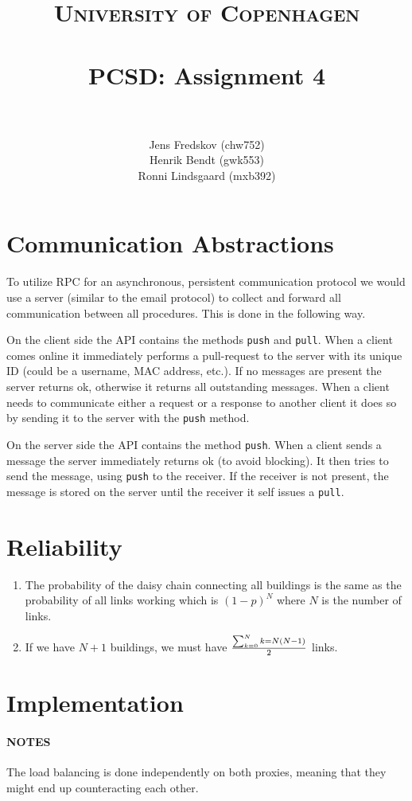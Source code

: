 \documentclass[a4paper, 11pt]{article}
\title{ 
\normalfont \normalsize 
\textsc{University of Copenhagen} \\ [25pt]
\horrule{0.5pt} \\[0.4cm]
\huge PCSD: Assignment 4 \\
\horrule{2pt} \\[0.5cm]
}
\author{Jens Fredskov (chw752)\\Henrik Bendt (gwk553)\\Ronni Lindsgaard (mxb392)} %
\begin{document}
\maketitle
\pagebreak

\section{Communication Abstractions} %
\label{sec:communication_abstractions}

To utilize RPC for an asynchronous, persistent communication protocol we would use a server (similar to the email protocol) to collect and forward all communication between all procedures. This is done in the following way.

On the client side the API contains the methods \texttt{push} and \texttt{pull}. When a client comes online it immediately performs a pull-request to the server with its unique ID (could be a username, MAC address, etc.). If no messages are present the server returns ok, otherwise it returns all outstanding messages. When a client needs to communicate either a request or a response to another client it does so by sending it to the server with the \texttt{push} method.

On the server side the API contains the method \texttt{push}. When a client sends a message the server immediately returns ok (to avoid blocking). It then tries to send the message, using \texttt{push} to the receiver. If the receiver is not present, the message is stored on the server until the receiver it self issues a \texttt{pull}.



\section{Reliability} %
\label{sec:reliability}

\begin{enumerate}
    \item The probability of the daisy chain connecting all buildings is the same as the probability of all links working which is $(1-p)^N$ where $N$ is the number of links.
    \item If we have $N+1$ buildings, we must have $\sum_{k=0}^N k = N(N-1) \over 2$ links. 
\end{enumerate}


\section{Implementation} %
\label{sec:implementation}

\paragraph{NOTES} %
\label{par:notes}

The load balancing is done independently on both proxies, meaning that they might end up counteracting each other.


\end{document}
